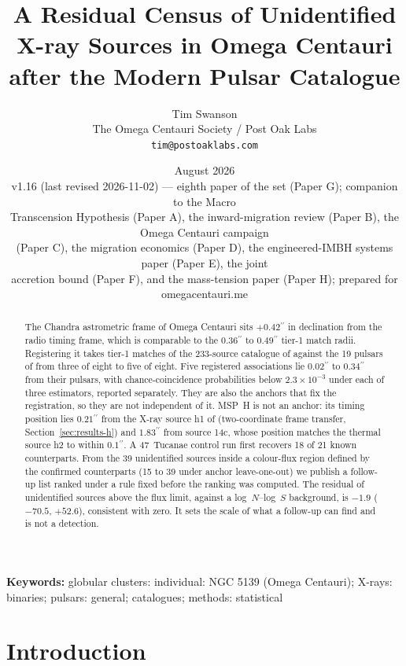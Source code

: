 \documentclass[11pt]{article}
\title{\textbf{A Residual Census of Unidentified X-ray Sources in Omega Centauri after the Modern Pulsar Catalogue}}
\author{Tim Swanson\\[2pt]
\small The Omega Centauri Society / Post Oak Labs\\
\small \texttt{tim@postoaklabs.com}}
\date{August 2026 \\[4pt] \small v1.16 (last revised 2026-11-02) --- eighth paper of the set (Paper G); companion to the Macro\\ \small Transcension Hypothesis (Paper A), the inward-migration review (Paper B), the Omega Centauri campaign\\ \small (Paper C), the migration economics (Paper D), the engineered-IMBH systems paper (Paper E), the joint\\ \small accretion bound (Paper F), and the mass-tension paper (Paper H); prepared for omegacentauri.me}
\newcommand{\as}{\ensuremath{^{\prime\prime}}}
\begin{document}
\maketitle

\begin{abstract}
\noindent
The Chandra astrometric frame of Omega Centauri sits $+0.42\as$ in declination from the radio timing frame, which is comparable to the $0.36\as$ to $0.49\as$ tier-1 match radii. Registering it takes tier-1 matches of the 233-source catalogue of \citet{Henleywillis2018} against the 19 pulsars of \citet{ColomiBernadich2026} from three of eight to five of eight. Five registered associations lie $0.02\as$ to $0.34\as$ from their pulsars, with chance-coincidence probabilities below $2.3\times10^{-3}$ under each of three estimators, reported separately. They are also the anchors that fix the registration, so they are not independent of it. MSP~H is not an anchor: its timing position lies $0.21\as$ from the X-ray source h1 of \citet{ZhaoHeinke2023} (two-coordinate frame transfer, Section~\ref{sec:results-h}) and $1.83\as$ from \citet{Henleywillis2018} source 14c, whose position matches the thermal source h2 to within $0.1\as$. A 47~Tucanae control run first recovers 18 of 21 known counterparts. From the 39 unidentified sources inside a colour-flux region defined by the confirmed counterparts (15 to 39 under anchor leave-one-out) we publish a follow-up list ranked under a rule fixed before the ranking was computed. The residual of unidentified sources above the flux limit, against a log~$N$--log~$S$ background, is $-1.9$ ($-70.5$, $+52.6$), consistent with zero. It sets the scale of what a follow-up can find and is not a detection.
\end{abstract}

\bigskip
\noindent\textbf{Keywords:} globular clusters: individual: NGC 5139 (Omega Centauri); X-rays: binaries; pulsars: general; catalogues; methods: statistical

\newpage
\tableofcontents
\newpage

\section{Introduction}
\label{sec:intro}
\end{document}
